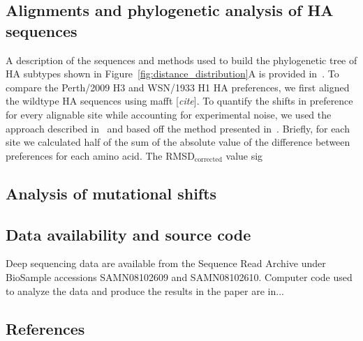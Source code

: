 \documentclass[9pt,twocolumn,twoside]{pnas-new}
\newcommand{\comment}[1]{{\color{red}[\textsl{#1}]}}
\begin{document}
{\subsection*{Alignments and phylogenetic analysis of HA sequences}
A description of the sequences and methods used to build the phylogenetic tree of HA subtypes shown in Figure~\ref{fig:distance_distribution}A is provided in~\cite{doud2017quantifying}.
To compare the Perth/2009 H3 and WSN/1933 H1 HA preferences, we first aligned the wildtype HA sequences using mafft \comment{cite}.
To quantify the shifts in preference for every alignable site while accounting for experimental noise, we used the approach described in~\cite{haddox2017mapping} and based off the method presented in~\cite{doud2015site}.
Briefly, for each site we calculated half of the sum of the absolute value of the difference between preferences for each amino acid.
The RMSD$_{\text{corrected}}$ value sig

\subsection*{Analysis of mutational shifts}

\subsection*{Data availability and source code}
Deep sequencing data are available from the Sequence Read Archive under BioSample accessions SAMN08102609 and SAMN08102610. Computer code used to analyze the data and produce the results in the paper are in...
}

\showmatmethods{} %


\showacknow{} %


\subsection*{References}

\end{document}
